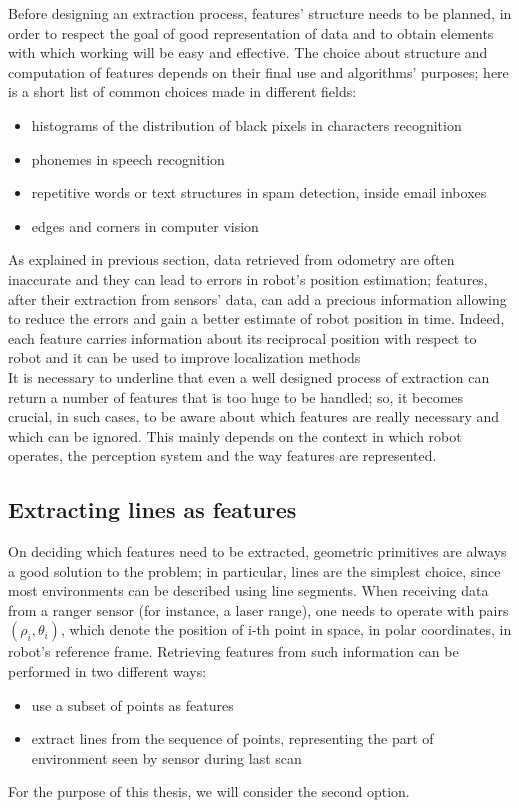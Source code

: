 \documentclass[a4paper, onecolumn]{report}
\begin{document}
Before designing an extraction process, features' structure needs to be planned, in order to respect the goal of good representation of data and to obtain elements with which working will be easy and effective.
The choice about structure and computation of features depends on their final use and algorithms' purposes; here is a short list of common choices made in different fields:
\begin{itemize}
	\item{histograms of the distribution of black pixels in characters recognition}
	\item{phonemes in speech recognition}
	\item{repetitive words or text structures in spam detection, inside email inboxes}
	\item{edges and corners in computer vision}
\end{itemize}

As explained in previous section, data retrieved from odometry are often inaccurate and they can lead to errors in robot's position estimation; features, after their extraction from sensors' data, can add a precious information allowing to reduce the errors and gain a better estimate of robot position in time. Indeed, each feature carries information about its reciprocal position with respect to robot and it can be used to improve localization methods\\
It is necessary to underline that even a well designed process of extraction can return a number of features that is too huge to be handled; so, it becomes crucial, in such cases, to be aware about which features are really necessary and which can be ignored. This mainly depends on the context in which robot operates, the perception system and the way features are represented.

\subsection{Extracting lines as features}
On deciding which features need to be extracted, geometric primitives are always a good solution to the problem; in particular, lines are the simplest choice, since most environments can be described using line segments.
When receiving data from a ranger sensor (for instance, a laser range), one needs to operate with pairs $(\rho_i, \theta_i)$, which denote the position of i-th point in space, in polar coordinates, in robot's reference frame. Retrieving features from such information can be performed in two different ways:
\begin{itemize}
	\item{use a subset of points as features}
	\item{extract lines from the sequence of points, representing the part of environment seen by sensor during last scan}
\end{itemize}
For the purpose of this thesis, we will consider the second option.
\end{document}
